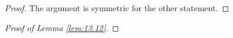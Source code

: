 \documentclass[../main.tex]{subfiles}
\begin{document}
\begin{lemma}
\begin{lemma*}
\begin{proof}
            The argument is symmetric for the other statement.
        \end{proof}
    \end{lemma*}
    \begin{proof}[Proof of Lemma \ref{lem:13.12}]


\end{proof}
\end{lemma}
\end{document}

